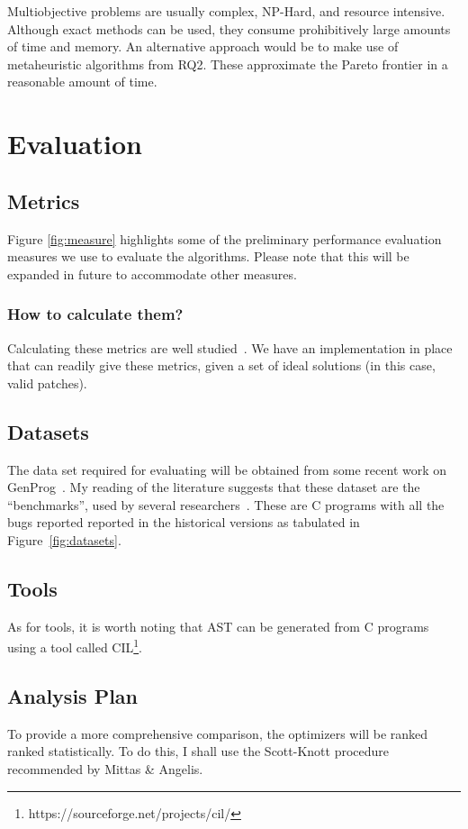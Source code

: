 \documentclass[]{sig-alternate}
\theoremstyle{break}
\begin{document}
Multiobjective problems are usually complex, NP-Hard, and resource intensive. Although exact methods can be used, they consume prohibitively large amounts of time and memory. An alternative approach would be to make use of metaheuristic algorithms from RQ2. These approximate the Pareto frontier in a reasonable amount of time.

\section{Evaluation}

%

\subsection{Metrics}
Figure \ref{fig:measure} highlights some of the preliminary performance evaluation measures we use to evaluate the algorithms. Please note that this will be expanded in future to accommodate other measures.

\subsubsection{How to calculate them?}
Calculating these metrics are well studied~\cite{deb2002fast, goel2010study}. We have an implementation in place that can readily give these metrics, given a set of ideal solutions (in this case, valid patches).

\subsection{Datasets}
The data set required for evaluating will be obtained from some recent work on GenProg~\cite{leGoues12}. My reading of the literature suggests that these dataset are the ``benchmarks'', used by several researchers~\cite{qi2014}. These are C programs with all the bugs reported reported in the historical versions as tabulated in Figure~\ref{fig:datasets}.

\subsection{Tools}
As for tools, it is worth noting that AST can be generated from C programs using a tool called CIL\footnote{https://sourceforge.net/projects/cil/}.

\subsection{Analysis Plan}
To provide a more comprehensive comparison, the optimizers will be ranked ranked statistically. To do this, I shall use the Scott-Knott procedure recommended by Mittas \& Angelis\cite{mittas13}.
\end{document}
